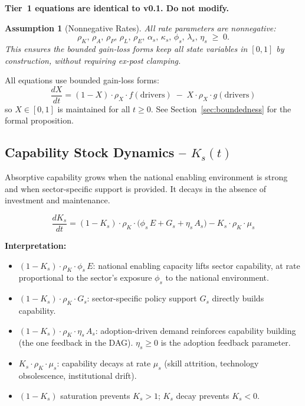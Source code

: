 \documentclass[11pt,a4paper]{article}
\newtheorem{assumption}{Assumption}
\begin{document}
\textbf{Tier~1 equations are identical to v0.1. Do not modify.}

\begin{assumption}[Nonnegative Rates]
All rate parameters are nonnegative:
\[
\rho_K,\, \rho_A,\, \rho_P,\, \rho_L,\, \rho_E,\, \alpha_s,\, \kappa_s,\, \phi_s,\, \lambda_s,\, \eta_s \;\geq\; 0.
\]
This ensures the bounded gain-loss forms keep all state variables in $[0,1]$ by construction, without requiring ex-post clamping.
\end{assumption}

All equations use bounded gain-loss forms:
\[
\frac{dX}{dt} = (1 - X)\cdot\rho_X \cdot f(\text{drivers}) \;-\; X\cdot\rho_X \cdot g(\text{drivers})
\]
so $X \in [0,1]$ is maintained for all $t \geq 0$. See Section~\ref{sec:boundedness} for the formal proposition.

\subsection{Capability Stock Dynamics -- \texorpdfstring{$K_s(t)$}{Ks(t)}}

Absorptive capability grows when the national enabling environment is strong and when sector-specific support is provided. It decays in the absence of investment and maintenance.

\begin{equation}
\boxed{
\frac{dK_s}{dt}
= (1 - K_s)\cdot\rho_K\cdot\bigl(\phi_s\, E + G_s + \eta_s\, A_s\bigr)
- K_s\cdot\rho_K\cdot\mu_s
}
\label{eq:Ks}
\end{equation}

\textbf{Interpretation:}
\begin{itemize}
  \item $(1 - K_s)\cdot\rho_K\cdot\phi_s\, E$: national enabling capacity lifts sector capability, at rate proportional to the sector's exposure $\phi_s$ to the national environment.
  \item $(1 - K_s)\cdot\rho_K\cdot G_s$: sector-specific policy support $G_s$ directly builds capability.
  \item $(1 - K_s)\cdot\rho_K\cdot\eta_s\, A_s$: adoption-driven demand reinforces capability building (the one feedback in the DAG). $\eta_s \geq 0$ is the adoption feedback parameter.
  \item $K_s\cdot\rho_K\cdot\mu_s$: capability decays at rate $\mu_s$ (skill attrition, technology obsolescence, institutional drift).
  \item $(1 - K_s)$ saturation prevents $K_s > 1$; $K_s$ decay prevents $K_s < 0$.
\end{itemize}
\end{document}
